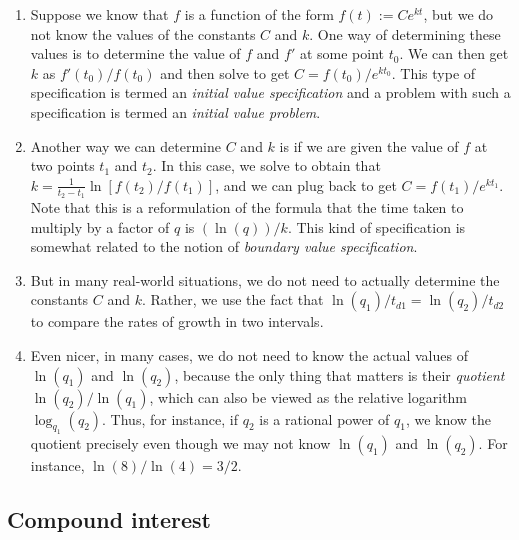 \documentclass{amsart}
\begin{document}
\begin{enumerate}
\item Suppose we know that $f$ is a function of the form $f(t) :=
  Ce^{kt}$, but we do not know the values of the constants $C$ and
  $k$. One way of determining these values is to determine the value
  of $f$ and $f'$ at some point $t_0$. We can then get $k$ as
  $f'(t_0)/f(t_0)$ and then solve to get $C = f(t_0)/e^{kt_0}$. This
  type of specification is termed an {\em initial value specification}
  and a problem with such a specification is termed an {\em initial
  value problem}.
\item Another way we can determine $C$ and $k$ is if we are given the
  value of $f$ at two points $t_1$ and $t_2$. In this case, we solve
  to obtain that $k = \frac{1}{t_2 - t_1} \ln[f(t_2)/f(t_1)]$, and we
  can plug back to get $C = f(t_1)/e^{kt_1}$. Note that this is a
  reformulation of the formula that the time taken to multiply by a
  factor of $q$ is $(\ln(q))/k$. This kind of specification is
  somewhat related to the notion of {\em boundary value
  specification}.
\item But in many real-world situations, we do not need to actually
  determine the constants $C$ and $k$. Rather, we use the fact that
  $\ln(q_1)/t_{d1} =\ln(q_2)/t_{d2}$ to compare the rates of growth in
  two intervals.
\item Even nicer, in many cases, we do not need to know the actual
  values of $\ln(q_1)$ and $\ln(q_2)$, because the only thing that
  matters is their {\em quotient} $\ln(q_2)/\ln(q_1)$, which can also
  be viewed as the relative logarithm $\log_{q_1}(q_2)$. Thus, for
  instance, if $q_2$ is a rational power of $q_1$, we know the
  quotient precisely even though we may not know $\ln(q_1)$ and
  $\ln(q_2)$. For instance, $\ln(8)/\ln(4) = 3/2$.
\end{enumerate}

\subsection{Compound interest}
\end{document}
